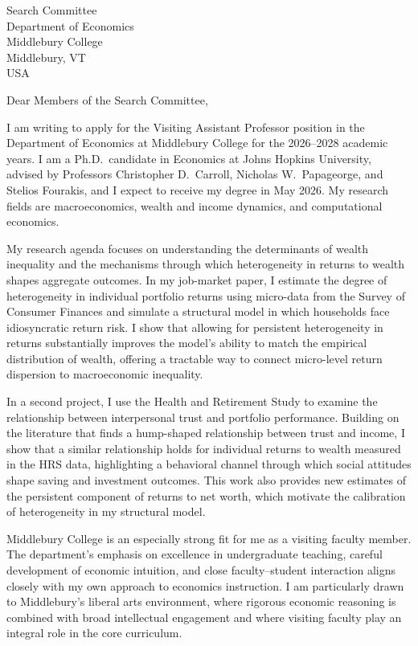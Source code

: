 \documentclass[11pt,letterpaper]{letter}
\begin{document}
\begin{letter}{Search Committee \\
Department of Economics \\
Middlebury College \\
Middlebury, VT \\ USA}

\opening{Dear Members of the Search Committee,}

I am writing to apply for the Visiting Assistant Professor position in the Department of Economics at Middlebury College for the 2026--2028 academic years. I am a Ph.D.\ candidate in Economics at Johns Hopkins University, advised by Professors Christopher D.~Carroll, Nicholas W.~Papageorge, and Stelios Fourakis, and I expect to receive my degree in May 2026. My research fields are macroeconomics, wealth and income dynamics, and computational economics.

My research agenda focuses on understanding the determinants of wealth inequality and the mechanisms through which heterogeneity in returns to wealth shapes aggregate outcomes. In my job-market paper, I estimate the degree of heterogeneity in individual portfolio returns using micro-data from the Survey of Consumer Finances and simulate a structural model in which households face idiosyncratic return risk. I show that allowing for persistent heterogeneity in returns substantially improves the model’s ability to match the empirical distribution of wealth, offering a tractable way to connect micro-level return dispersion to macroeconomic inequality.

In a second project, I use the Health and Retirement Study to examine the relationship between interpersonal trust and portfolio performance. Building on the literature that finds a hump-shaped relationship between trust and income, I show that a similar relationship holds for individual returns to wealth measured in the HRS data, highlighting a behavioral channel through which social attitudes shape saving and investment outcomes. This work also provides new estimates of the persistent component of returns to net worth, which motivate the calibration of heterogeneity in my structural model.

Middlebury College is an especially strong fit for me as a visiting faculty member. The department’s emphasis on excellence in undergraduate teaching, careful development of economic intuition, and close faculty–student interaction aligns closely with my own approach to economics instruction. I am particularly drawn to Middlebury’s liberal arts environment, where rigorous economic reasoning is combined with broad intellectual engagement and where visiting faculty play an integral role in the core curriculum.


\end{letter}
\end{document}
